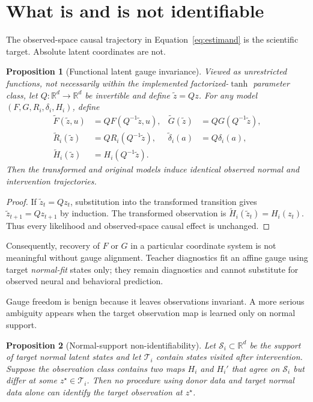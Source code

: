 \documentclass[11pt]{article}
\newtheorem{proposition}{Proposition}
\newcommand{\R}{\mathbb{R}}
\newcommand{\calS}{\mathcal{S}}
\newcommand{\calT}{\mathcal{T}}
\begin{document}
\section{What is and is not identifiable}
\label{sec:identifiability}

The observed-space causal trajectory in Equation~\ref{eq:estimand}
is the scientific target. Absolute latent coordinates are not.

\begin{proposition}[Functional latent gauge invariance]
\label{prop:gauge}
Viewed as unrestricted functions, not necessarily within the implemented
factorized-\(\tanh\) parameter class, let
\(Q:\R^d\rightarrow\R^d\) be invertible and define
\(\widetilde z=Qz\). For any model \((F,G,R_i,\delta_i,H_i)\), define
\begin{align*}
  \widetilde F(\widetilde z,u)
    &= QF(Q^{-1}\widetilde z,u),&
  \widetilde G(\widetilde z)
    &= QG(Q^{-1}\widetilde z),\\
  \widetilde R_i(\widetilde z)
    &= QR_i(Q^{-1}\widetilde z),&
  \widetilde\delta_i(a)
    &= Q\delta_i(a),\\
  \widetilde H_i(\widetilde z)
    &= H_i(Q^{-1}\widetilde z).
\end{align*}
Then the transformed and original models induce identical observed normal and
intervention trajectories.
\end{proposition}

\begin{proof}
If \(\widetilde z_t=Qz_t\), substitution into the transformed transition gives
\(\widetilde z_{t+1}=Qz_{t+1}\) by induction. The transformed observation is
\(\widetilde H_i(\widetilde z_t)=H_i(z_t)\). Thus every likelihood and
observed-space causal effect is unchanged.
\end{proof}

Consequently, recovery of \(F\) or \(G\) in a particular coordinate system is
not meaningful without gauge alignment. Teacher diagnostics fit an affine
gauge using target \emph{normal-fit} states only; they remain diagnostics and
cannot substitute for observed neural and behavioral prediction.

Gauge freedom is benign because it leaves observations invariant. A more
serious ambiguity appears when the target observation map is learned only on
normal support.

\begin{proposition}[Normal-support non-identifiability]
\label{prop:support}
Let \(\calS_i\subset\R^d\) be the support of target normal latent states and let
\(\calT_i\) contain states visited after intervention. Suppose the observation
class contains two maps \(H_i\) and \(H_i'\) that agree on \(\calS_i\) but
differ at some \(z^\star\in\calT_i\). Then no procedure using donor data and
target normal data alone can identify the target observation at \(z^\star\).
\end{proposition}
\end{document}

